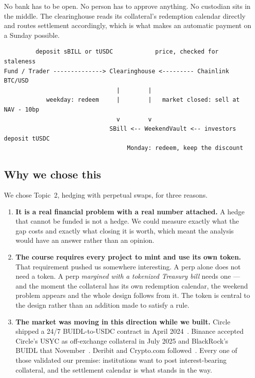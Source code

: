 \documentclass[11pt,a4paper]{article}
\begin{document}
No bank has to be open. No person has to approve anything. No custodian sits in the middle. The
clearinghouse reads its collateral's redemption calendar directly and routes settlement
accordingly, which is what makes an automatic payment on a Sunday possible.

\begin{center}\small
\begin{verbatim}
         deposit sBILL or tUSDC            price, checked for staleness
Fund / Trader --------------> Clearinghouse <--------- Chainlink BTC/USD
                                |        |
            weekday: redeem     |        |   market closed: sell at NAV - 10bp
                                v        v
                              SBill <-- WeekendVault <-- investors deposit tUSDC
                                   Monday: redeem, keep the discount
\end{verbatim}
\end{center}

\subsection{Why we chose this}

We chose Topic~2, hedging with perpetual swaps, for three reasons.

\begin{enumerate}
  \item \textbf{It is a real financial problem with a real number attached.} A hedge that cannot be
  funded is not a hedge. We could measure exactly what the gap costs and exactly what closing it is
  worth, which meant the analysis would have an answer rather than an opinion.
  \item \textbf{The course requires every project to mint and use its own token.} That requirement
  pushed us somewhere interesting. A perp alone does not need a token. A perp \emph{margined with a
  tokenized Treasury bill} needs one — and the moment the collateral has its own redemption
  calendar, the weekend problem appears and the whole design follows from it. The token is central
  to the design rather than an addition made to satisfy a rule.
  \item \textbf{The market was moving in this direction while we built.} Circle shipped a 24/7
  BUIDL-to-USDC contract in April 2024~\cite{circle}. Binance accepted Circle's USYC as off-exchange
  collateral in July 2025 and BlackRock's BUIDL that November~\cite{binance,protofire}. Deribit and
  Crypto.com followed~\cite{deribit}. Every one of those validated our premise: institutions want to
  post interest-bearing collateral, and the settlement calendar is what stands in the way.
\end{enumerate}
\end{document}
